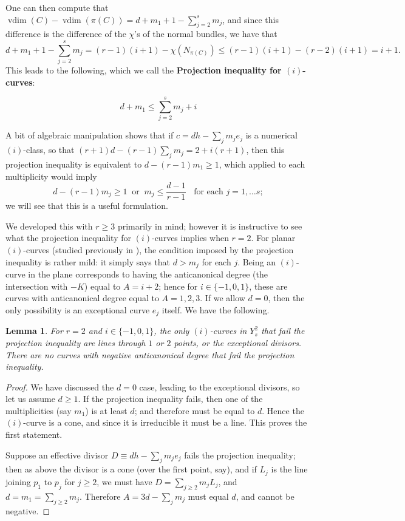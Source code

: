 \documentclass[12pt]{article}
\numberwithin{equation}{section}
\newtheorem{lemma}[equation]{Lemma}
\numberwithin{equation}{section}
\numberwithin{subeq}{equation}
\newcommand{\vdim}{\operatorname{vdim}}
\begin{document}
One can then compute that
$\vdim(C)-\vdim(\pi(C)) = d+m_1 + 1 - \sum_{j=2}^s m_j $,
and since this difference is the difference of the $\chi$'s of the normal bundles,
we have that
\[
d+m_1 + 1 -  \sum_{j=2}^s m_j = (r-1)(i+1)-\chi(N_{\pi(C)}) 
\leq (r-1)(i+1)-(r-2)(i+1) = i+1.
\]
This leads to the following,
which we call the {\bf Projection inequality for $(i)$-curves}:

\begin{equation}\label{projectioninequalityicurves}
d+m_1 \leq \sum_{j=2}^s m_j + i
\end{equation}

A bit of algebraic manipulation shows that
if $c = dh-\sum_j m_j e_j$ is a numerical $(i)$-class,
so that $(r+1)d - (r-1)\sum_j m_j = 2+i(r+1)$,
then this projection inequality is equivalent to $d-(r-1)m_1 \geq 1$,
which applied to each multiplicity would imply
\begin{equation}\label{projectioninequalityiclass}
d-(r-1)m_j \geq 1  \;\;\text{or}\;\; m_j \leq \frac{d-1}{r-1}\;\;\text{ for each } j = 1,\ldots s;
\end{equation}
we will see that this is a useful formulation.

We developed this with $r \geq 3$ primarily in mind;
however it is instructive to see what the projection inequality for $(i)$-curves
implies when $r=2$.
For planar $(i)$-curves (studied previously in \cite{DO}),
the condition imposed by the projection inequality is rather mild:
it simply says that $d > m_j$ for each $j$.
Being an $(i)$-curve in the plane corresponds to having the anticanonical degree
(the intersection with $-K$)
equal to $A=i+2$; hence for $i \in \{-1,0,1\}$,
these are curves with anticanonical degree equal to $A=1,2,3$.
If we allow $d=0$, then the only possibility is an exceptional curve $e_j$ itself.
We have the following.

\begin{lemma}\label{planarcase}
For $r=2$ and $i \in \{-1,0,1\}$,
the only $(i)$-curves in $Y^2_s$ that fail the projection inequality
are lines through $1$ or $2$ points, or the exceptional divisors.
There are no curves with negative anticanonical degree that fail the projection inequality.
\end{lemma}

\begin{proof}
We have discussed the $d=0$ case, leading to the exceptional divisors,
so let us assume $d \geq 1$.
If the projection inequality fails, then one of the multiplicities (say $m_1$)
is at least $d$; and therefore must be equal to $d$.
Hence the $(i)$-curve is a cone, and since it is irreducible it must be a line.
This proves the first statement.

Suppose an effective divisor $D \equiv dh-\sum_j m_je_j$ fails the projection inequality;
then as above the divisor is a cone (over the first point, say),
and if $L_j$ is the line joining $p_1$ to $p_j$ for $j \geq 2$,
we must have $D = \sum_{j \geq 2} m_j L_j$, and $d = m_1 = \sum_{j \geq 2} m_j$.
Therefore $A = 3d-\sum_j m_j$ must equal $d$,
and cannot be negative.

\end{proof}
\end{document}

